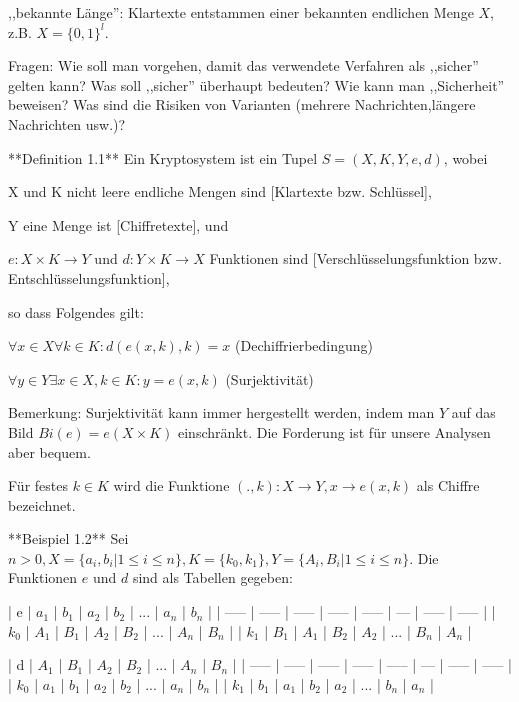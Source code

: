 \documentclass[a4paper]{article}
\begin{document}
\begin{multicols}{3}
    ,,bekannte Länge'': Klartexte entstammen einer bekannten endlichen Menge $X$, z.B. $X=\{0,1\}^l$.

    Fragen: Wie soll man vorgehen, damit das verwendete Verfahren als ,,sicher'' gelten kann? Was soll ,,sicher'' überhaupt bedeuten? Wie kann man ,,Sicherheit'' beweisen? Was sind die Risiken von Varianten (mehrere Nachrichten,längere Nachrichten usw.)?

    **Definition 1.1** Ein Kryptosystem ist ein Tupel $S=(X,K,Y,e,d)$, wobei
    \begin{itemize*}
        \item X und K nicht leere endliche Mengen sind [Klartexte bzw. Schlüssel],
        \item Y eine Menge ist [Chiffretexte], und
        \item $e:X\times K\rightarrow Y$ und $d:Y\times K\rightarrow X$ Funktionen sind [Verschlüsselungsfunktion bzw. Entschlüsselungsfunktion],
    \end{itemize*}

    so dass Folgendes gilt:
    \begin{enumerate*}
        \item $\forall x\in X\forall k\in K:d(e(x,k),k) =x$ (Dechiffrierbedingung)
        \item $\forall y\in Y\exists x\in X,k\in K:y=e(x,k)$ (Surjektivität)
    \end{enumerate*}

    Bemerkung: Surjektivität kann immer hergestellt werden, indem man $Y$ auf das Bild $Bi(e) =e(X\times K)$ einschränkt. Die Forderung ist für unsere Analysen aber bequem.

    Für festes $k\in K$ wird die Funktione $(.,k):X\rightarrow Y,x \rightarrow e(x,k)$ als Chiffre bezeichnet.

    **Beispiel 1.2** Sei $n>0, X=\{a_i,b_i| 1\leq i\leq n\},K=\{k_0,k_1\},Y=\{A_i,B_i| 1\leq i\leq n\}$. Die Funktionen $e$ und $d$ sind als Tabellen gegeben:

    | e     | $a_1$ | $b_1$ | $a_2$ | $b_2$ | ... | $a_n$ | $b_n$ |
    | ----- | ----- | ----- | ----- | ----- | --- | ----- | ----- |
    | $k_0$ | $A_1$ | $B_1$ | $A_2$ | $B_2$ | ... | $A_n$ | $B_n$ |
    | $k_1$ | $B_1$ | $A_1$ | $B_2$ | $A_2$ | ... | $B_n$ | $A_n$ |

    | d     | $A_1$ | $B_1$ | $A_2$ | $B_2$ | ... | $A_n$ | $B_n$ |
    | ----- | ----- | ----- | ----- | ----- | --- | ----- | ----- |
    | $k_0$ | $a_1$ | $b_1$ | $a_2$ | $b_2$ | ... | $a_n$ | $b_n$ |
    | $k_1$ | $b_1$ | $a_1$ | $b_2$ | $a_2$ | ... | $b_n$ | $a_n$ |


\end{multicols}
\end{document}
